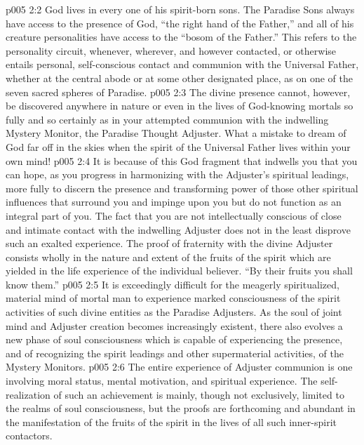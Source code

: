 \vs p005 2:2 God lives in every one of his spirit\hyp{}born sons. The Paradise Sons always have access to the presence of God, “the right hand of the Father,” and all of his creature personalities have access to the “bosom of the Father.” This refers to the personality circuit, whenever, wherever, and however contacted, or otherwise entails personal, self\hyp{}conscious contact and communion with the Universal Father, whether at the central abode or at some other designated place, as on one of the seven sacred spheres of Paradise.
\vs p005 2:3 The divine presence cannot, however, be discovered anywhere in nature or even in the lives of God\hyp{}knowing mortals so fully and so certainly as in your attempted communion with the indwelling Mystery Monitor, the Paradise Thought Adjuster. What a mistake to dream of God far off in the skies when the spirit of the Universal Father lives within your own mind!
\pc \vs p005 2:4 It is because of this God fragment that indwells you that you can hope, as you progress in harmonizing with the Adjuster’s spiritual leadings, more fully to discern the presence and transforming power of those other spiritual influences that surround you and impinge upon you but do not function as an integral part of you. The fact that you are not intellectually conscious of close and intimate contact with the indwelling Adjuster does not in the least disprove such an exalted experience. The proof of fraternity with the divine Adjuster consists wholly in the nature and extent of the fruits of the spirit which are yielded in the life experience of the individual believer. \textcolor{ubdarkred}{“By their fruits you shall know them.”}
\vs p005 2:5 It is exceedingly difficult for the meagerly spiritualized, material mind of mortal man to experience marked consciousness of the spirit activities of such divine entities as the Paradise Adjusters. As the soul of joint mind and Adjuster creation becomes increasingly existent, there also evolves a new phase of soul consciousness which is capable of experiencing the presence, and of recognizing the spirit leadings and other supermaterial activities, of the Mystery Monitors.
\vs p005 2:6 The entire experience of Adjuster communion is one involving moral status, mental motivation, and spiritual experience. The self\hyp{}realization of such an achievement is mainly, though not exclusively, limited to the realms of soul consciousness, but the proofs are forthcoming and abundant in the manifestation of the fruits of the spirit in the lives of all such inner\hyp{}spirit contactors.\plusone
{}
